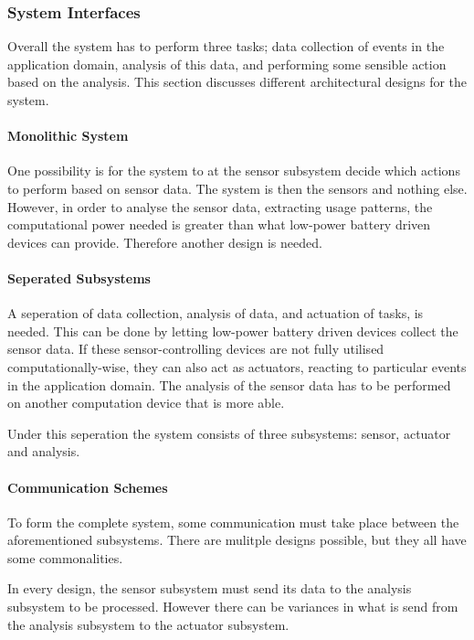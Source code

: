 \subsubsection{System Interfaces}

Overall the system has to perform three tasks; data collection of events in the
application domain, analysis of this data, and performing some sensible action
based on the analysis. This section discusses different architectural designs
for the system.

\paragraph{Monolithic System} One possibility is for the system to at the sensor
subsystem decide which actions to perform based on sensor data. The system is
then the sensors and nothing else. However, in order to analyse the sensor data,
extracting usage patterns, the computational power needed is greater than what
low-power battery driven devices can provide. Therefore another design is
needed.

\paragraph{Seperated Subsystems} A seperation of data collection, analysis of
data, and actuation of tasks, is needed. This can be done by letting low-power
battery driven devices collect the sensor data. If these sensor-controlling
devices are not fully utilised computationally-wise, they can also act as
actuators, reacting to particular events in the application domain. The analysis
of the sensor data has to be performed on another computation device that is
more able.

Under this seperation the system consists of three subsystems: sensor, actuator
and analysis. 

\paragraph{Communication Schemes} To form the complete system, some
communication must take place between the aforementioned subsystems. There are
mulitple designs possible, but they all have some commonalities.

In every design, the sensor subsystem must send its data to the analysis
subsystem to be processed. However there can be variances in what is send from
the analysis subsystem to the actuator subsystem.

